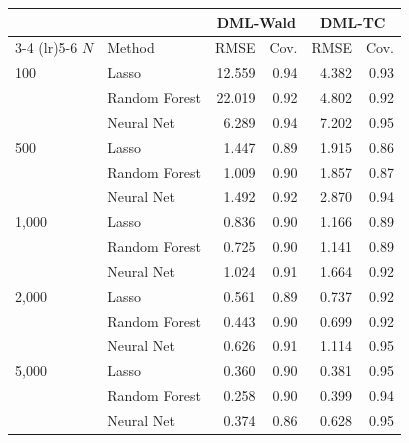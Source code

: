 \begin{tabular}{llrrrr}
\toprule
 & & \multicolumn{2}{c}{DML-Wald} & \multicolumn{2}{c}{DML-TC} \\
\cmidrule(lr){3-4} \cmidrule(lr){5-6}
$N$ & Method & RMSE & Cov. & RMSE & Cov. \\
\midrule
100 & Lasso & 12.559 & 0.94 & 4.382 & 0.93 \\
 & Random Forest & 22.019 & 0.92 & 4.802 & 0.92 \\
 & Neural Net & 6.289 & 0.94 & 7.202 & 0.95 \\
\midrule
500 & Lasso & 1.447 & 0.89 & 1.915 & 0.86 \\
 & Random Forest & 1.009 & 0.90 & 1.857 & 0.87 \\
 & Neural Net & 1.492 & 0.92 & 2.870 & 0.94 \\
\midrule
1,000 & Lasso & 0.836 & 0.90 & 1.166 & 0.89 \\
 & Random Forest & 0.725 & 0.90 & 1.141 & 0.89 \\
 & Neural Net & 1.024 & 0.91 & 1.664 & 0.92 \\
\midrule
2,000 & Lasso & 0.561 & 0.89 & 0.737 & 0.92 \\
 & Random Forest & 0.443 & 0.90 & 0.699 & 0.92 \\
 & Neural Net & 0.626 & 0.91 & 1.114 & 0.95 \\
\midrule
5,000 & Lasso & 0.360 & 0.90 & 0.381 & 0.95 \\
 & Random Forest & 0.258 & 0.90 & 0.399 & 0.94 \\
 & Neural Net & 0.374 & 0.86 & 0.628 & 0.95 \\
\bottomrule
\end{tabular}
